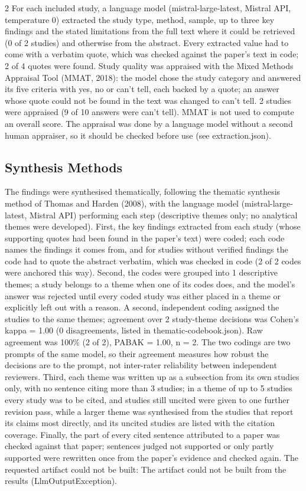 \documentclass[10pt,a4paper]{article}
\begin{document}
\begin{multicols}{2}
For each included study, a language model (mistral-large-latest, Mistral API, temperature 0) extracted the study type, method, sample, up to three key findings and the stated limitations from the full text where it could be retrieved (0 of 2 studies) and otherwise from the abstract.
Every extracted value had to come with a verbatim quote, which was checked against the paper's text in code; 2 of 4 quotes were found.
Study quality was appraised with the Mixed Methods Appraisal Tool (MMAT, 2018): the model chose the study category and answered its five criteria with yes, no or can't tell, each backed by a quote; an answer whose quote could not be found in the text was changed to can't tell. 2 studies were appraised (9 of 10 answers were can't tell).
MMAT is not used to compute an overall score.
The appraisal was done by a language model without a second human appraiser, so it should be checked before use (see extraction.json).

\subsection{Synthesis Methods}\label{sec:synthesis-methods}

The findings were synthesised thematically, following the thematic synthesis method of Thomas and Harden (2008), with the language model (mistral-large-latest, Mistral API) performing each step (descriptive themes only; no analytical themes were developed).
First, the key findings extracted from each study (whose supporting quotes had been found in the paper's text) were coded; each code names the findings it comes from, and for studies without verified findings the code had to quote the abstract verbatim, which was checked in code (2 of 2 codes were anchored this way).
Second, the codes were grouped into 1 descriptive themes; a study belongs to a theme when one of its codes does, and the model's answer was rejected until every coded study was either placed in a theme or explicitly left out with a reason.
A second, independent coding assigned the studies to the same themes; agreement over 2 study-theme decisions was Cohen's kappa = 1.00 (0 disagreements, listed in thematic-codebook.\allowbreak{}json).
Raw agreement was 100\% (2 of 2), PABAK = 1.00, n = 2.
The two codings are two prompts of the same model, so their agreement measures how robust the decisions are to the prompt, not inter-rater reliability between independent reviewers.
Third, each theme was written up as a subsection from its own studies only, with no sentence citing more than 3 studies; in a theme of up to 5 studies every study was to be cited, and studies still uncited were given to one further revision pass, while a larger theme was synthesised from the studies that report its claims most directly, and its uncited studies are listed with the citation coverage.
Finally, the part of every cited sentence attributed to a paper was checked against that paper; sentences judged not supported or only partly supported were rewritten once from the paper's evidence and checked again.
The requested artifact could not be built: The artifact could not be built from the results (LlmOutputException).


\end{multicols}
\end{document}
